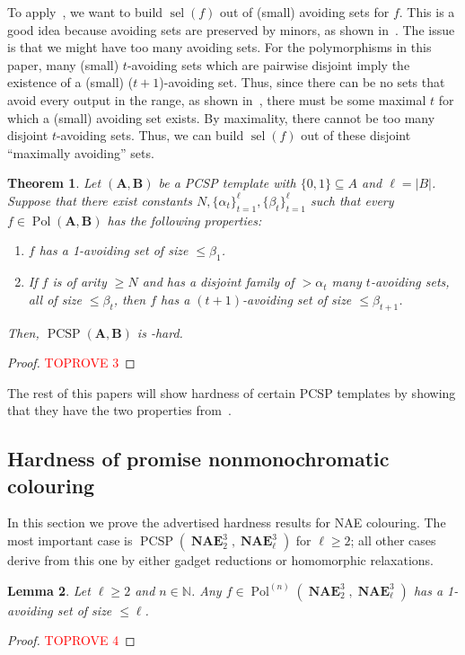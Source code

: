 \documentclass[a4paper,11pt]{article}
\newcommand{\2}{\vec{2}}
\newcommand{\1}{\vec{1}}
\newcommand{\0}{\vec{0}}
\renewcommand{\A}{\ensuremath{\mathbf{A}}}
\newcommand{\B}{\ensuremath{\mathbf{B}}}
\DeclareMathOperator{\sel}{sel}
\DeclareMathOperator{\PCSP}{PCSP}
\DeclareMathOperator{\Pol}{Pol}
\DeclareMathOperator{\NAE}{\mathbf{NAE}}
\theoremstyle{plain}
\newtheorem{theorem}{Theorem}
\newtheorem{lemma}[theorem]{Lemma}
\theoremstyle{definition}
\begin{document}
To apply~, we want to build $\sel(f)$ out of (small)
avoiding sets for $f$. This is a good idea because avoiding sets are preserved
by minors, as shown in~. The issue is that we might have too many
avoiding sets. For the polymorphisms in this paper, many (small) $t$-avoiding
sets which are pairwise disjoint imply the existence of a (small)
($t+1$)-avoiding set. Thus, since there can be no sets that avoid every output
in the range, as shown in~, there must be some maximal $t$ for which a (small) avoiding set exists. By maximality, there cannot be too many disjoint $t$-avoiding sets. Thus, we can build $\sel(f)$ out of these disjoint ``maximally avoiding'' sets.

\begin{theorem}\label{our hardness condition}
  Let $(\A,\B)$ be a PCSP template with $\{0, 1\} \subseteq A$ and $\ell = |B|$.
Suppose that there exist constants $N,\{\alpha_t\}_{t=1}^\ell,\{\beta_t\}_{t=1}^\ell$ such that every $f \in \Pol(\A,\B)$ has the following properties:
\begin{enumerate}
    \item $f$ has a 1-avoiding set of size $\leq \beta_1$.
    \item If $f$ is of arity $\geq N$ and has a disjoint family of $> \alpha_t$ many $t$-avoiding sets, all of size $\leq \beta_t$, then $f$ has a $(t+1)$-avoiding set of size $\leq \beta_{t+1}$.
\end{enumerate}
Then, $\PCSP(\A,\B)$ is \NP-hard.
\end{theorem}
\begin{proof}\textcolor{red}{TOPROVE 3}\end{proof}
The rest of this papers will show hardness of certain PCSP templates by showing that they have the two properties from~.

\subsection{Hardness of promise nonmonochromatic colouring}

In this section we prove the advertised hardness results for NAE colouring. The most important case is $\PCSP(\NAE_2^3, \NAE_\ell^3)$ for $\ell \geq 2$; all other cases derive from this one by either gadget reductions or homomorphic relaxations.

\begin{lemma}\label{lem:lem1}
	Let $\ell \geq 2$ and $n \in \mathbb{N}$.
    Any $f \in \Pol^{(n)}(\NAE_2^3, \NAE_\ell^3)$ has a 1-avoiding set of size $ \leq \ell$.
\end{lemma}
\begin{proof}\textcolor{red}{TOPROVE 4}\end{proof}
\end{document}
